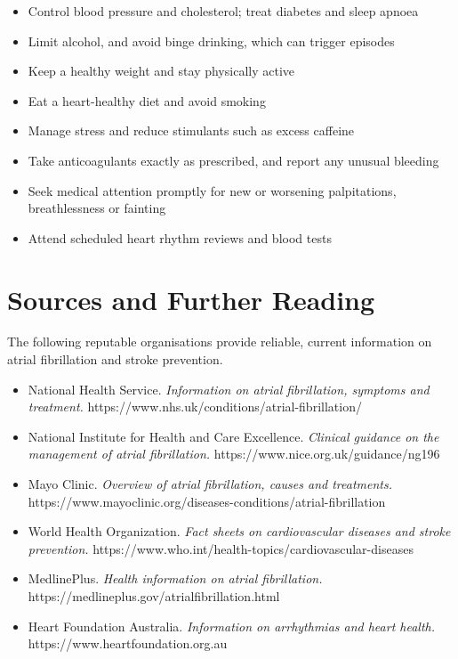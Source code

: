 \begin{itemize}
    \item Control blood pressure and cholesterol; treat diabetes and sleep apnoea
    \item Limit alcohol, and avoid binge drinking, which can trigger episodes
    \item Keep a healthy weight and stay physically active
    \item Eat a heart-healthy diet and avoid smoking
    \item Manage stress and reduce stimulants such as excess caffeine
    \item Take anticoagulants exactly as prescribed, and report any unusual bleeding
    \item Seek medical attention promptly for new or worsening palpitations, breathlessness or fainting
    \item Attend scheduled heart rhythm reviews and blood tests
\end{itemize}

\section*{Sources and Further Reading}
The following reputable organisations provide reliable, current information on atrial fibrillation and stroke prevention.

\begin{itemize}
    \item National Health Service. \textit{Information on atrial fibrillation, symptoms and treatment.} https://www.nhs.uk/conditions/atrial-fibrillation/
    \item National Institute for Health and Care Excellence. \textit{Clinical guidance on the management of atrial fibrillation.} https://www.nice.org.uk/guidance/ng196
    \item Mayo Clinic. \textit{Overview of atrial fibrillation, causes and treatments.} https://www.mayoclinic.org/diseases-conditions/atrial-fibrillation
    \item World Health Organization. \textit{Fact sheets on cardiovascular diseases and stroke prevention.} https://www.who.int/health-topics/cardiovascular-diseases
    \item MedlinePlus. \textit{Health information on atrial fibrillation.} https://medlineplus.gov/atrialfibrillation.html
    \item Heart Foundation Australia. \textit{Information on arrhythmias and heart health.} https://www.heartfoundation.org.au
\end{itemize}
